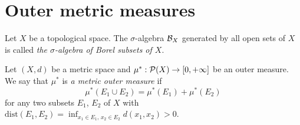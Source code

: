 \section{Outer metric measures}

\begin{definition}
Let $X$ be a topological space. The $\sigma$-algebra ${\mathcal B}_X$ generated by all open sets of $X$ is called \textit{the $\sigma$-algebra of Borel subsets of $X$}.
\end{definition}

\begin{definition}
Let $(X,d)$ be a metric space and $\mu^*:{\mathcal P}(X)\rightarrow [0,+\infty]$ be an outer measure. We say that $\mu^*$ is \textit{a metric outer measure} if  
$$\mu^*(E_1\cup E_2)=\mu^*(E_1)+\mu^*(E_2)$$
for any two subsets $E_1$, $E_2$ of $X$ with $\mathrm{dist}(E_1,E_2)=\inf_{x_1\in E_1,\,x_2\in E_2}d(x_1,x_2)>0$.
\end{definition}


